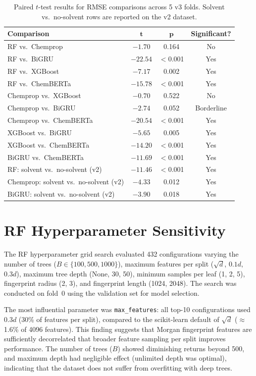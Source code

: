 \documentclass[journal=jcisd8,manuscript=suppinfo]{achemso}
\begin{document}
\begin{table}[htbp]
\centering
\caption{Paired $t$-test results for RMSE comparisons across 5 v3 folds. Solvent vs.\ no-solvent rows are reported on the v2 dataset.}
\label{tab:significance}
\begin{tabular}{lccc}
\toprule
\textbf{Comparison} & $\boldsymbol{t}$ & $\boldsymbol{p}$ & \textbf{Significant?} \\
\midrule
RF vs.\ Chemprop & $-1.70$ & 0.164 & No \\
RF vs.\ BiGRU & $-22.54$ & $<$0.001 & Yes \\
RF vs.\ XGBoost & $-7.17$ & 0.002 & Yes \\
RF vs.\ ChemBERTa & $-15.78$ & $<$0.001 & Yes \\
Chemprop vs.\ XGBoost & $-0.70$ & 0.522 & No \\
Chemprop vs.\ BiGRU & $-2.74$ & 0.052 & Borderline \\
Chemprop vs.\ ChemBERTa & $-20.54$ & $<$0.001 & Yes \\
XGBoost vs.\ BiGRU & $-5.65$ & 0.005 & Yes \\
XGBoost vs.\ ChemBERTa & $-14.20$ & $<$0.001 & Yes \\
BiGRU vs.\ ChemBERTa & $-11.69$ & $<$0.001 & Yes \\
\midrule
RF: solvent vs.\ no-solvent (v2) & $-11.46$ & $<$0.001 & Yes \\
Chemprop: solvent vs.\ no-solvent (v2) & $-4.33$ & 0.012 & Yes \\
BiGRU: solvent vs.\ no-solvent (v2) & $-3.90$ & 0.018 & Yes \\
\bottomrule
\end{tabular}
\end{table}


\section{RF Hyperparameter Sensitivity}
\label{sec:rf_tuning}

The RF hyperparameter grid search evaluated 432 configurations varying the number of trees ($B \in \{100, 500, 1000\}$), maximum features per split ($\sqrt{d}$, $0.1d$, $0.3d$), maximum tree depth (None, 30, 50), minimum samples per leaf (1, 2, 5), fingerprint radius (2, 3), and fingerprint length (1024, 2048).
The search was conducted on fold~0 using the validation set for model selection.

The most influential parameter was \texttt{max\_features}: all top-10 configurations used $0.3d$ (30\% of features per split), compared to the scikit-learn default of $\sqrt{d}$ ($\approx$1.6\% of 4096 features).
This finding suggests that Morgan fingerprint features are sufficiently decorrelated that broader feature sampling per split improves performance.
The number of trees ($B$) showed diminishing returns beyond 500, and maximum depth had negligible effect (unlimited depth was optimal), indicating that the dataset does not suffer from overfitting with deep trees.
\end{document}
